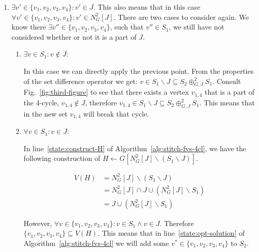 \begin{enumerate}
\begin{figure}[H]
\begin{minipage}{0.49\textwidth}
\begin{tikzpicture}[scale=0.8]
            \end{tikzpicture}
            \caption{$\forall v \in \{v_1,v_2,v_3,v_4\}: v \notin J$}
            \label{fig:second-figure}
        \end{minipage}
    \end{figure}


    \item $\exists v' \in \{v_1,v_2,v_3,v_4\}: v' \in J$. This also means that in this case 
    $\forall v' \in \{v_1,v_2,v_3,v_4\}: v' \in N^{2}_{G}[J]$.
    There are two cases to consider again. We know there $\exists v'' \in \{v_1,v_2,v_3,v_4\}$, 
    such that $v'' \in S_1$, we still have not considered whether or not it is a part of $J$.

    \begin{enumerate}
        \item $\exists v \in S_1: v \notin J$:
        
        In this case we can directly apply the previous point. From the properties of the set 
        difference operator we get: $v \in S_1 \backslash J \subseteq S_2 \oplus^{2}_{G,J} S_1$. 
        Consult Fig.~\ref{fig:third-figure} to see that there exists a vertex $v_{1,4}$ that is a part of 
        the 4-cycle, $v_{1,4} \notin J$, therefore $v_{1,4} \in S_1 \backslash J \subseteq S_2 \oplus^{2}_{G,J} S_1$.
        This means that in the new set $v_{1,4}$ will break that cycle.

        \item $\forall v \in S_1: v \in J$:

        In line~\ref{state:construct-H} of Algorithm~\ref{alg:stitch-fvs-4cl}, we have the following 
        construction of $H \leftarrow G[N^{2}_{G}[J] \backslash (S_1 \backslash J)]$. 

        \begin{align}
            V(H) &= N^{2}_{G}[J] \backslash (S_1 \backslash J) \\
                 &= N^{2}_{G}[J] \cap J \cup (N^{2}_G[J] \backslash S_1) \\
                 &= J \cup (N^{2}_G[J] \backslash S_1)
        \end{align}

        However, $\forall v \in \{v_1,v_2,v_3,v_4\}: v \in S_1 \land v \in J$. 
        Therefore $\{v_1,v_2,v_3,v_4\} \subseteq V(H)$. This means that in line~\ref{state:opt-solution} of 
        Algorithm~\ref{alg:stitch-fvs-4cl} we will add some $v^{*} \in \{v_1,v_2,v_3,v_4\}$ to $S_2$.


\end{enumerate}
\end{enumerate}
